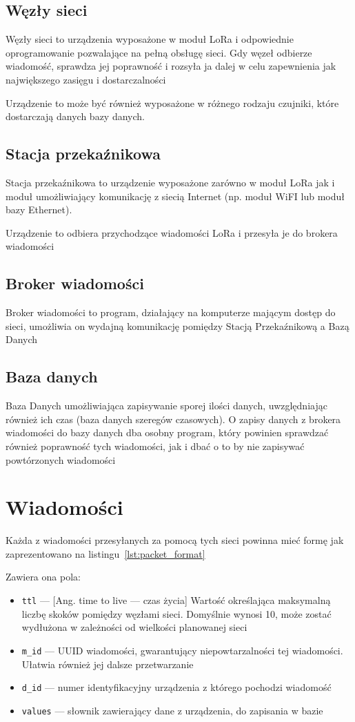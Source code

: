 \subsection{Węzły sieci}
Węzły sieci to urządzenia wyposażone w moduł LoRa i odpowiednie oprogramowanie pozwalające na pełną obsługę sieci. Gdy węzeł odbierze wiadomość, sprawdza jej poprawność i rozsyła ja dalej w celu zapewnienia jak największego zasięgu i dostarczalności

Urządzenie to może być również wyposażone w różnego rodzaju czujniki, które dostarczają danych bazy danych.

\subsection{Stacja przekaźnikowa}
Stacja przekaźnikowa to urządzenie wyposażone zarówno w moduł LoRa jak i moduł umożliwiający komunikację z siecią Internet (np. moduł WiFI lub moduł bazy Ethernet).

Urządzenie to odbiera przychodzące wiadomości LoRa i przesyła je do brokera wiadomości

\subsection{Broker wiadomości}
Broker wiadomości to program, działający na komputerze mającym dostęp do sieci, umożliwia on wydajną komunikację pomiędzy Stacją Przekaźnikową a Bazą Danych

\subsection{Baza danych}
Baza Danych umożliwiająca zapisywanie sporej ilości danych, uwzględniając również ich czas (baza danych szeregów czasowych).
O zapisy danych z brokera wiadomości do bazy danych dba osobny program, który powinien sprawdzać również poprawność tych wiadomości, jak i dbać o to by nie zapisywać powtórzonych wiadomości

\section{Wiadomości}
Każda z wiadomości przesyłanych za pomocą tych sieci powinna mieć formę jak zaprezentowano na listingu~\ref{lst:packet_format}

Zawiera ona pola:
\begin{itemize}
    \item \texttt{ttl} — [Ang. time to live — czas życia] Wartość określająca maksymalną liczbę skoków pomiędzy węzłami sieci. Domyślnie wynosi 10, może zostać wydłużona w zależności od wielkości planowanej sieci
    \item \texttt{m\_id} — UUID \cite{RFC:uuid} wiadomości, gwarantujący niepowtarzalności tej wiadomości. Ułatwia również jej dalsze przetwarzanie
    \item \texttt{d\_id} — numer identyfikacyjny urządzenia z którego pochodzi wiadomość
    \item \texttt{values} — słownik zawierający dane z urządzenia, do zapisania w bazie
\end{itemize}

